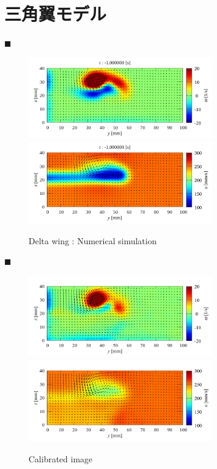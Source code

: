 \documentclass[twocolumn,a4j]{jsarticle}
\begin{document}
\section{三角翼モデル}
$\blacksquare$ 
\begin{figure}[htbp]
  \centering
  {\includegraphics[keepaspectratio, width=80mm]{../images/simulation/velocity_and_vorticity}
    \includegraphics[keepaspectratio, width=80mm]{../images/simulation/velocity_xyz}
  }
  \caption{Delta wing : Numerical simulation}
\end{figure}

$\blacksquare$ 
\begin{figure}[htbp]
  \centering
  {\includegraphics[keepaspectratio, width=80mm]{../images/analysis/velocity_and_vorticity}
    \includegraphics[keepaspectratio, width=80mm]{../images/analysis/velocity_xyz}
  }
  \caption{Calibrated image}
\end{figure}
\end{document}
